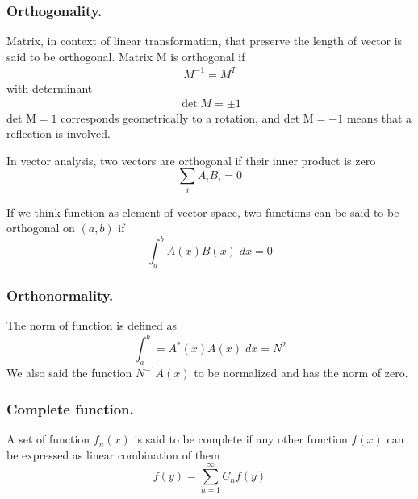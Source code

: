 \documentclass[../main.tex]{subfiles}
\begin{document}
\subsubsection*{Orthogonality.} Matrix, in context of linear transformation, that preserve the length of vector is said to be orthogonal.
Matrix M is orthogonal if
\begin{align*}
    M^{-1}=M^T
\end{align*} 
with determinant
\begin{align*}
    \det M = \pm 1
\end{align*}
det $\text{M} = 1$ corresponds geometrically to a rotation, and det $\text{M} = -1$ means that a reflection is involved.

In vector analysis, two vectors are orthogonal if their inner product is zero 
\begin{equation*}
    \sum_{i}A_iB_i=0
\end{equation*}

If we think function as element of vector space, two functions can be said to be orthogonal on $(a,b)$ if 
\begin{equation*}
    \int_{a}^{b}A(x)B(x)\;dx=0
\end{equation*}

\subsubsection*{Orthonormality.} The norm of function is defined as 
\begin{equation*}
    \int_{a}^{b}=A^*(x)A(x)\;dx=N^2
\end{equation*}
We also said the function $N^{-1}A(x)$ to be normalized and has the norm of zero.

\subsubsection*{Complete function.} A set of function $f_n(x)$ is said to be complete if any other function $f(x)$ can be expressed as linear combination of them 
\begin{equation*}
    f(y)=\sum_{n=1}^{\infty} C_nf(y)
\end{equation*}
\end{document}
